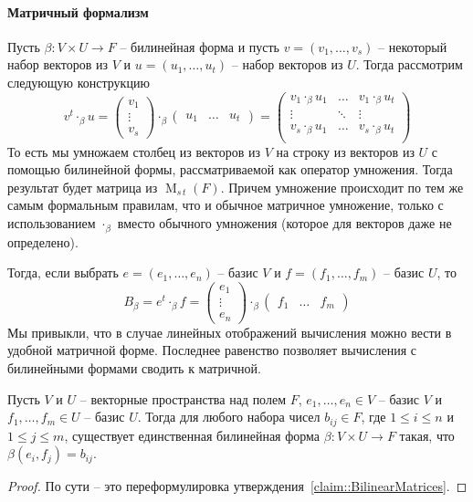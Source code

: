 \paragraph{Матричный формализм}

Пусть $\beta\colon V\times U\to F$ -- билинейная форма и пусть $v = (v_1,\ldots,v_s)$ -- некоторый набор векторов из $V$ и $u = (u_1,\ldots,u_t)$ -- набор векторов из $U$.
Тогда рассмотрим следующую конструкцию
\[
v^t\cdot_\beta u = 
\begin{pmatrix}
{v_1}\\{\vdots}\\{v_s}
\end{pmatrix}
\cdot_\beta
\begin{pmatrix}
{u_1}&{\ldots}&{u_t}
\end{pmatrix}
=
\begin{pmatrix}
{v_1\cdot_\beta u_1}&{\ldots}&{v_1\cdot_\beta u_t}\\
{\vdots}&{\ddots}&{\vdots}\\
{v_s\cdot_\beta u_1}&{\ldots}&{v_s\cdot_\beta u_t}\\
\end{pmatrix}
\]
То есть мы умножаем столбец из векторов из $V$ на строку из векторов из $U$ с помощью билинейной формы, рассматриваемой как оператор умножения.
Тогда результат будет матрица из $\operatorname{M}_{s\,t}(F)$.
Причем умножение происходит по тем же самым формальным правилам, что и обычное матричное умножение, только с использованием $\cdot_\beta$ вместо обычного умножения (которое для векторов даже не определено).

Тогда, если выбрать $e = (e_1,\ldots,e_n)$ -- базис $V$ и $f = (f_1,\ldots,f_m)$ -- базис $U$, то 
\[
B_\beta = e^t\cdot_\beta f = 
\begin{pmatrix}
{e_1}\\{\vdots}\\{e_n}
\end{pmatrix}
\cdot_\beta
\begin{pmatrix}
{f_1}&{\ldots}&{f_m}
\end{pmatrix}
\]
Мы привыкли, что в случае линейных отображений вычисления можно вести в удобной матричной форме.
Последнее равенство позволяет вычисления с билинейными формами сводить к матричной.

\begin{claim}
Пусть $V$ и $U$ -- векторные пространства над полем $F$, $e_1,\ldots,e_n \in V$ -- базис $V$ и $f_1,\ldots,f_m\in U$ -- базис $U$.
Тогда для любого набора чисел $b_{ij}\in F$, где $1\leqslant i \leqslant n$ и $1\leqslant j \leqslant m$, существует единственная билинейная форма $\beta\colon V\times U\to F$ такая, что $\beta(e_i,f_j) = b_{ij}$.
\end{claim}
\begin{proof}
По сути -- это переформулировка утверждения~\ref{claim::BilinearMatrices}.
\end{proof}

